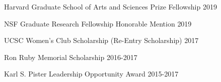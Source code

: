 \begin{cvhonors}
 \cvhonor
	{Harvard Graduate School of Arts and Sciences Prize Fellowship}
	{2019}

 \cvhonor
	{NSF Graduate Research Fellowship Honorable Mention}
	{2019}

 \cvhonor
	{UCSC Women's Club Scholarship (Re-Entry Scholarship)}
	{2017}

 \cvhonor
	{Ron Ruby Memorial Scholarship}
	{2016-2017}
	
 \cvhonor
	{Karl S. Pister Leadership Opportunity Award}
	{2015-2017}
\end{cvhonors}
